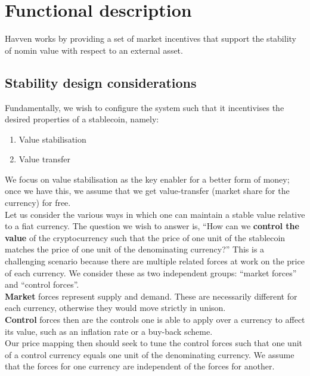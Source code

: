 \section{Functional description}

Havven works by providing a set of market incentives that support the stability of nomin value with respect to an external asset.

\subsection{Stability design considerations}

Fundamentally, we wish to configure the system such that it incentivises the desired properties of a stablecoin, namely:
\begin{enumerate}
    \item Value stabilisation
    \item Value transfer
\end{enumerate}

\noindent We focus on value stabilisation as the key enabler for a better form of money; once we have this, we assume that we get value-transfer (market share for the currency) for free. \\

\noindent Let us consider the various ways in which one can maintain a stable value relative to a fiat currency. The question we wish to answer is, ``How can we \textbf{control the value} of the cryptocurrency such that the price of one unit of the stablecoin matches the price of one unit of the denominating currency?'' This is a challenging scenario because there are multiple related forces at work on the price of each currency. We consider these as two independent groups: ``market forces'' and ``control forces''. \\

\noindent \textbf{Market} forces represent supply and demand. These are necessarily different for each currency, otherwise they would move strictly in unison. \\

\noindent \textbf{Control} forces then are the controls one is able to apply over a currency to affect its value, such as an inflation rate or a buy-back scheme. \\

\noindent Our price mapping then should seek to tune the control forces such that one unit of a control currency equals one unit of the denominating currency. We assume that the forces for one currency are independent of the forces for another. \\

